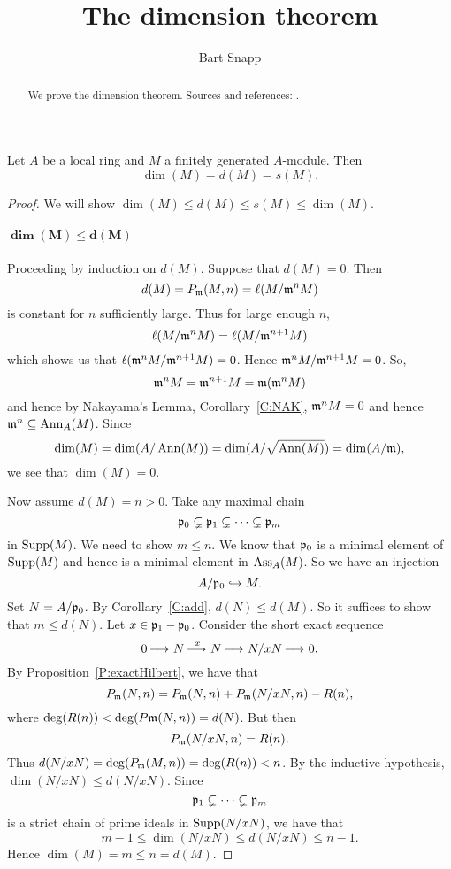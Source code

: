 \documentclass{ximera}
\author{Bart Snapp}
\title{The dimension theorem}
\begin{document}
\begin{abstract}
  We prove the dimension theorem. Sources and
  references: \cite{sD2008}.
\end{abstract}
\maketitle



\begin{theorem}\label{T:dimension} Let $A$ be a local ring and $M$ a finitely generated $A$-module. Then
\[
\dim(M) = d(M) = s(M). 
\]
\end{theorem}

\begin{proof} We will show $\dim(M)\le d(M) \le s(M) \le \dim(M)$. 


\paragraph{$\boldsymbol{\dim(M)\le d(M)}$} Proceeding by induction on $d(M)$. Suppose that $d(M) = 0$. Then 
\[
d(M) = P_{\mathfrak{m}}(M,n) = \ell(M/\mathfrak{m}^n M)
\]
is constant for $n$ sufficiently large. Thus for large enough $n$, 
\[
\ell(M/\mathfrak{m}^n M) = \ell(M/\mathfrak{m}^{n+1}M)
\]
which shows us that $\ell(\mathfrak{m}^n M/\mathfrak{m}^{n+1}M) = 0$. Hence $\mathfrak{m}^n M/\mathfrak{m}^{n+1}M = 0$. So, 
\[
\mathfrak{m}^n M = \mathfrak{m}^{n+1}M = \mathfrak{m}(\mathfrak{m}^n M)
\]
and hence by Nakayama's Lemma, Corollary~\ref{C:NAK}, $\mathfrak{m}^n M =0$ and hence $\mathfrak{m}^n\subseteq\operatorname{Ann}_A(M)$. Since
\[
\dim(M) = \dim(A/\operatorname{Ann}(M))  = \dim(A/\sqrt{\operatorname{Ann}(M)}) = \dim(A/\mathfrak{m}),
\]   
we see that $\dim(M) = 0$. 

Now assume $d(M) = n> 0$. Take any maximal chain 
\[
\mathfrak{p}_0\subsetneq \mathfrak{p}_1 \subsetneq \cdots \subsetneq \mathfrak{p}_m
\]
in $\operatorname{Supp}(M)$.  We need to show $m\le n$. We know that $\mathfrak{p}_0$ is a minimal element of $\operatorname{Supp}(M)$ and hence is a minimal element in $\operatorname{Ass}_A(M)$.  So we have an injection
\[
A/\mathfrak{p}_0\hookrightarrow M.
\]
Set $N = A/\mathfrak{p}_0$.  By Corollary~\ref{C:add}, $d(N) \le d(M)$.  So it suffices to show that $m \le d(N)$.  Let $x \in \mathfrak{p}_1 - \mathfrak{p}_0$.  Consider the short exact sequence
\[
0\mathop{\longrightarrow\,}\limits N \mathop{\longrightarrow\,}\limits^{x} N \mathop{\longrightarrow\,}\limits N/xN \mathop{\longrightarrow\,}\limits 0.
\]
By Proposition~\ref{P:exactHilbert}, we have that
\[P_{\mathfrak{m}}(N,n) = P_{\mathfrak{m}}(N,n) + P_{\mathfrak{m}}(N/xN,n) - R(n),\]
where $\deg(R(n)) < \deg(P\mathfrak{m}(N,n)) = d(N)$.  But then
\[P_{\mathfrak{m}}(N/xN,n) = R(n).\]
Thus $d(N/xN) = \deg(P_{\mathfrak{m}}(M,n)) = \deg(R(n)) < n$.  By the inductive hypothesis, $\dim(N/xN) \le d(N/xN)$.  Since
\[\mathfrak{p}_1 \subsetneq \cdots \subsetneq \mathfrak{p}_m\]
is a strict chain of prime ideals in $\operatorname{Supp}(N/xN)$, we have that
\[m - 1 \le \dim(N/xN) \le d(N/xN) \le n - 1.\]
Hence $\dim(M) = m \le n = d(M)$.


\end{proof}
\end{document}
